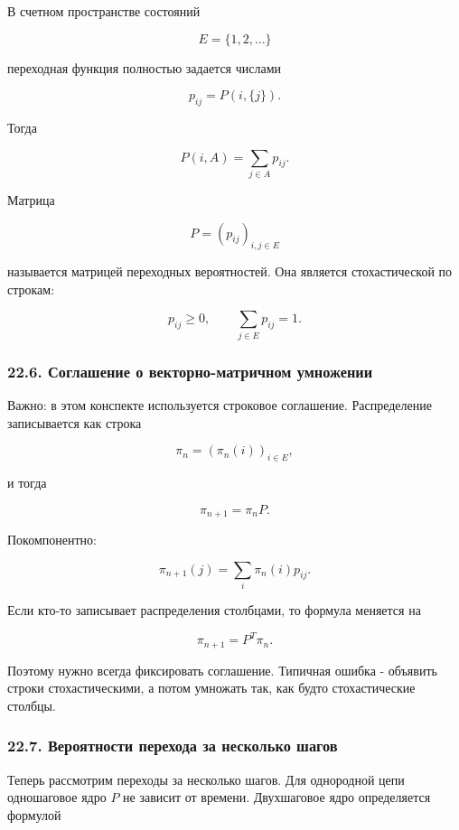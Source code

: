 \documentclass[
  11pt,
  a4paper,
]{article}
\begin{document}
В счетном пространстве состояний

\[
E=\{1,2,\ldots\}
\]

переходная функция полностью задается числами

\[
p_{ij}=P(i,\{j\}).
\]

Тогда

\[
P(i,A)=\sum_{j\in A}p_{ij}.
\]

Матрица

\[
P=(p_{ij})_{i,j\in E}
\]

называется матрицей переходных вероятностей. Она является стохастической
по строкам:

\[
p_{ij}\ge0,
\qquad
\sum_{j\in E}p_{ij}=1.
\]

\subsubsection{22.6. Соглашение о векторно-матричном
умножении}\label{ux441ux43eux433ux43bux430ux448ux435ux43dux438ux435-ux43e-ux432ux435ux43aux442ux43eux440ux43dux43e-ux43cux430ux442ux440ux438ux447ux43dux43eux43c-ux443ux43cux43dux43eux436ux435ux43dux438ux438}

Важно: в этом конспекте используется строковое соглашение. Распределение
записывается как строка

\[
\pi_n=(\pi_n(i))_{i\in E},
\]

и тогда

\[
\pi_{n+1}=\pi_nP.
\]

Покомпонентно:

\[
\pi_{n+1}(j)
=
\sum_i \pi_n(i)p_{ij}.
\]

Если кто-то записывает распределения столбцами, то формула меняется на

\[
\pi_{n+1}=P^T\pi_n.
\]

Поэтому нужно всегда фиксировать соглашение. Типичная ошибка - объявить
строки стохастическими, а потом умножать так, как будто стохастические
столбцы.

\subsubsection{22.7. Вероятности перехода за несколько
шагов}\label{ux432ux435ux440ux43eux44fux442ux43dux43eux441ux442ux438-ux43fux435ux440ux435ux445ux43eux434ux430-ux437ux430-ux43dux435ux441ux43aux43eux43bux44cux43aux43e-ux448ux430ux433ux43eux432}

Теперь рассмотрим переходы за несколько шагов. Для однородной цепи
одношаговое ядро \(P\) не зависит от времени. Двухшаговое ядро
определяется формулой
\end{document}
